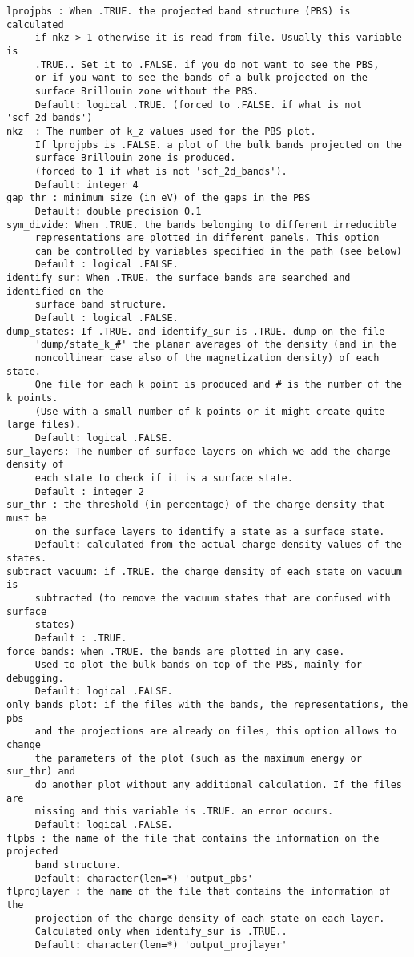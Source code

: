 \documentclass[12pt,a4paper]{article}
\begin{document}
\begin{verbatim}
lprojpbs : When .TRUE. the projected band structure (PBS) is calculated 
     if nkz > 1 otherwise it is read from file. Usually this variable is
     .TRUE.. Set it to .FALSE. if you do not want to see the PBS, 
     or if you want to see the bands of a bulk projected on the 
     surface Brillouin zone without the PBS.
     Default: logical .TRUE. (forced to .FALSE. if what is not 'scf_2d_bands')
nkz  : The number of k_z values used for the PBS plot. 
     If lprojpbs is .FALSE. a plot of the bulk bands projected on the 
     surface Brillouin zone is produced.
     (forced to 1 if what is not 'scf_2d_bands').
     Default: integer 4
gap_thr : minimum size (in eV) of the gaps in the PBS
     Default: double precision 0.1
sym_divide: When .TRUE. the bands belonging to different irreducible 
     representations are plotted in different panels. This option
     can be controlled by variables specified in the path (see below)
     Default : logical .FALSE.
identify_sur: When .TRUE. the surface bands are searched and identified on the
     surface band structure. 
     Default : logical .FALSE.
dump_states: If .TRUE. and identify_sur is .TRUE. dump on the file 
     'dump/state_k_#' the planar averages of the density (and in the 
     noncollinear case also of the magnetization density) of each state. 
     One file for each k point is produced and # is the number of the k points.
     (Use with a small number of k points or it might create quite large files).
     Default: logical .FALSE.
sur_layers: The number of surface layers on which we add the charge density of 
     each state to check if it is a surface state.
     Default : integer 2
sur_thr : the threshold (in percentage) of the charge density that must be
     on the surface layers to identify a state as a surface state.
     Default: calculated from the actual charge density values of the states.
subtract_vacuum: if .TRUE. the charge density of each state on vacuum is
     subtracted (to remove the vacuum states that are confused with surface
     states)
     Default : .TRUE.
force_bands: when .TRUE. the bands are plotted in any case.
     Used to plot the bulk bands on top of the PBS, mainly for debugging.
     Default: logical .FALSE.
only_bands_plot: if the files with the bands, the representations, the pbs
     and the projections are already on files, this option allows to change
     the parameters of the plot (such as the maximum energy or sur_thr) and
     do another plot without any additional calculation. If the files are
     missing and this variable is .TRUE. an error occurs.
     Default: logical .FALSE.
flpbs : the name of the file that contains the information on the projected
     band structure.
     Default: character(len=*) 'output_pbs'
flprojlayer : the name of the file that contains the information of the
     projection of the charge density of each state on each layer.
     Calculated only when identify_sur is .TRUE..
     Default: character(len=*) 'output_projlayer'
\end{verbatim}
\end{document}
